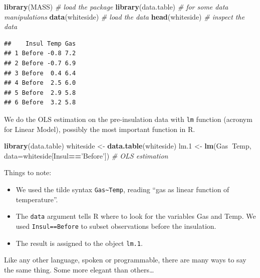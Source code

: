 \documentclass[]{book}
\newenvironment{Shaded}{\begin{snugshade}}{\end{snugshade}}
\newcommand{\CommentTok}[1]{\textcolor[rgb]{0.56,0.35,0.01}{\textit{#1}}}
\newcommand{\DataTypeTok}[1]{\textcolor[rgb]{0.13,0.29,0.53}{#1}}
\newcommand{\FloatTok}[1]{\textcolor[rgb]{0.00,0.00,0.81}{#1}}
\newcommand{\KeywordTok}[1]{\textcolor[rgb]{0.13,0.29,0.53}{\textbf{#1}}}
\newcommand{\NormalTok}[1]{#1}
\newcommand{\OperatorTok}[1]{\textcolor[rgb]{0.81,0.36,0.00}{\textbf{#1}}}
\newcommand{\StringTok}[1]{\textcolor[rgb]{0.31,0.60,0.02}{#1}}
\providecommand{\tightlist}{%
  \setlength{\itemsep}{0pt}\setlength{\parskip}{0pt}}
\theoremstyle{definition}
\theoremstyle{definition}
\theoremstyle{definition}
\theoremstyle{remark}
\begin{document}
\begin{Shaded}
\begin{Highlighting}[]
\KeywordTok{library}\NormalTok{(MASS) }\CommentTok{# load the package}
\KeywordTok{library}\NormalTok{(data.table) }\CommentTok{# for some data manipulations}
\KeywordTok{data}\NormalTok{(whiteside) }\CommentTok{# load the data}
\KeywordTok{head}\NormalTok{(whiteside) }\CommentTok{# inspect the data}
\end{Highlighting}
\end{Shaded}

\begin{verbatim}
##    Insul Temp Gas
## 1 Before -0.8 7.2
## 2 Before -0.7 6.9
## 3 Before  0.4 6.4
## 4 Before  2.5 6.0
## 5 Before  2.9 5.8
## 6 Before  3.2 5.8
\end{verbatim}

We do the OLS estimation on the pre-insulation data with \texttt{lm} function (acronym for Linear Model), possibly the most important function in R.

\begin{Shaded}
\begin{Highlighting}[]
\KeywordTok{library}\NormalTok{(data.table)}
\NormalTok{whiteside <-}\StringTok{ }\KeywordTok{data.table}\NormalTok{(whiteside)}
\NormalTok{lm}\FloatTok{.1}\NormalTok{ <-}\StringTok{ }\KeywordTok{lm}\NormalTok{(Gas}\OperatorTok{~}\NormalTok{Temp, }\DataTypeTok{data=}\NormalTok{whiteside[Insul}\OperatorTok{==}\StringTok{'Before'}\NormalTok{]) }\CommentTok{# OLS estimation }
\end{Highlighting}
\end{Shaded}

Things to note:

\begin{itemize}
\tightlist
\item
  We used the tilde syntax \texttt{Gas\textasciitilde{}Temp}, reading ``gas as linear function of temperature''.
\item
  The \texttt{data} argument tells R where to look for the variables Gas and Temp.
  We used \texttt{Insul==\textquotesingle{}Before\textquotesingle{}} to subset observations before the insulation.
\item
  The result is assigned to the object \texttt{lm.1}.
\end{itemize}

Like any other language, spoken or programmable, there are many ways to say the same thing. Some more elegant than others\ldots{}
\end{document}
